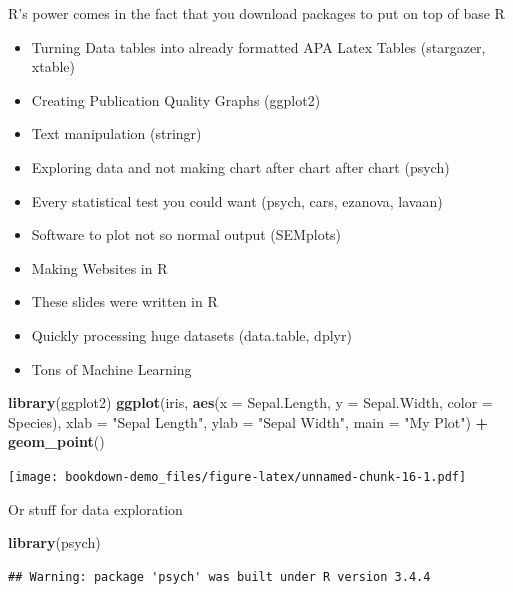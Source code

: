 \documentclass[]{book}
\newenvironment{Shaded}{\begin{snugshade}}{\end{snugshade}}
\newcommand{\KeywordTok}[1]{\textcolor[rgb]{0.13,0.29,0.53}{\textbf{#1}}}
\newcommand{\DataTypeTok}[1]{\textcolor[rgb]{0.13,0.29,0.53}{#1}}
\newcommand{\StringTok}[1]{\textcolor[rgb]{0.31,0.60,0.02}{#1}}
\newcommand{\OperatorTok}[1]{\textcolor[rgb]{0.81,0.36,0.00}{\textbf{#1}}}
\newcommand{\NormalTok}[1]{#1}
\providecommand{\tightlist}{%
  \setlength{\itemsep}{0pt}\setlength{\parskip}{0pt}}
\theoremstyle{definition}
\theoremstyle{definition}
\theoremstyle{definition}
\theoremstyle{remark}
\begin{document}
R's power comes in the fact that you download packages to put on top of
base R

\begin{itemize}
\tightlist
\item
  Turning Data tables into already formatted APA Latex Tables
  (stargazer, xtable)
\item
  Creating Publication Quality Graphs (ggplot2)
\item
  Text manipulation (stringr)
\item
  Exploring data and not making chart after chart after chart (psych)
\item
  Every statistical test you could want (psych, cars, ezanova, lavaan)
\item
  Software to plot not so normal output (SEMplots)
\item
  Making Websites in R
\item
  These slides were written in R
\item
  Quickly processing huge datasets (data.table, dplyr)
\item
  Tons of Machine Learning
\end{itemize}

\begin{Shaded}
\begin{Highlighting}[]
\KeywordTok{library}\NormalTok{(ggplot2)}
\KeywordTok{ggplot}\NormalTok{(iris, }\KeywordTok{aes}\NormalTok{(}\DataTypeTok{x =}\NormalTok{ Sepal.Length, }\DataTypeTok{y =}\NormalTok{ Sepal.Width, }
                 \DataTypeTok{color =}\NormalTok{ Species), }
       \DataTypeTok{xlab =} \StringTok{"Sepal Length"}\NormalTok{,}
       \DataTypeTok{ylab =} \StringTok{"Sepal Width"}\NormalTok{,}
       \DataTypeTok{main =} \StringTok{"My Plot"}\NormalTok{) }\OperatorTok{+}\StringTok{ }\KeywordTok{geom_point}\NormalTok{()}
\end{Highlighting}
\end{Shaded}

\texttt{[image: bookdown-demo\_files/figure-latex/unnamed-chunk-16-1.pdf]}

Or stuff for data exploration

\begin{Shaded}
\begin{Highlighting}[]
\KeywordTok{library}\NormalTok{(psych)}
\end{Highlighting}
\end{Shaded}

\begin{verbatim}
## Warning: package 'psych' was built under R version 3.4.4
\end{verbatim}
\end{document}
